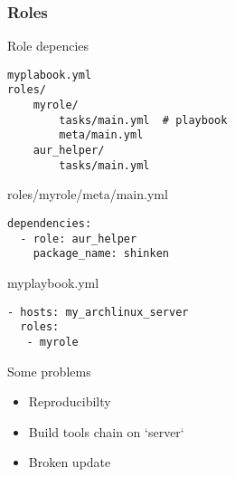 \documentclass{beamer}
\begin{document}
\begin{frame}[fragile]
\frametitle{Roles}
    \footnotesize{
    \begin{block}{Role depencies}
        \begin{verbatim}
myplabook.yml
roles/
    myrole/
        tasks/main.yml  # playbook
        meta/main.yml
    aur_helper/
        tasks/main.yml
        \end{verbatim}
    \end{block}


    \begin{block}{roles/myrole/meta/main.yml}
        \begin{verbatim}
dependencies:
  - role: aur_helper
    package_name: shinken
        \end{verbatim}
    \end{block}

    \begin{block}{myplaybook.yml}
        \begin{verbatim}
- hosts: my_archlinux_server
  roles:
   - myrole
        \end{verbatim}
    \end{block}
    }
\end{frame}



\begin{frame}
    \begin{alertblock}{Some problems}
        \begin{itemize}
            \item Reproducibilty
            \item Build tools chain on `server`
            \item Broken update
        \end{itemize}
    \end{alertblock}

    \vfill

\end{frame}

\begin{frame}
\end{frame}


\begin{frame}
\end{frame}

\begin{frame}
\end{frame}
\end{document}
